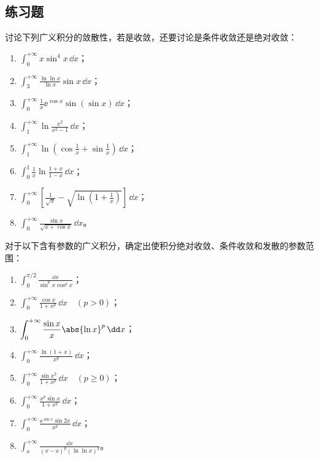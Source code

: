 \subsection{练习题}

\begin{xexercise}[1]
讨论下列广义积分的敛散性，若是收敛，还要讨论是条件收敛还是绝对收敛：
  \begin{enumerate}[label=(\arabic*)]
    \item $\displaystyle\int_0^{+\infty}x\sin^4x\,\dd x$；
    \item $\displaystyle\int_3^{+\infty}\frac{\ln\ln x}{\ln x}\sin x\,\dd x$；
    \item $\displaystyle\int_0^{+\infty}\frac1x\ee^{\cos x}\sin(\sin x)\,\dd x$；
    \item $\displaystyle\int_1^{+\infty}\ln\frac{x^2}{x^2-1}\,\dd x$；
    \item $\displaystyle\int_1^{+\infty}\ln\left(\cos\frac1x+\sin\frac1x\right)\,\dd x$；
    \item $\displaystyle\int_0^1\frac1x\ln\frac{1+x}{1-x}\,\dd x$；
    \item $\displaystyle\int_0^{+\infty}\left[\frac1{\sqrt{x}}-\sqrt{\ln\left(1+\frac1x\right)}\right]\,\dd x$；
    \item $\displaystyle\int_0^{+\infty}\frac{\sin x}{\sqrt{x+\cos x}}\,\dd x$。
  \end{enumerate}
\end{xexercise}

\begin{xexercise}[2]
对于以下含有参数的广义积分，确定出使积分绝对收敛、条件收敛和发散的参数范围：
  \begin{enumerate}[label=(\arabic*)]
    \item $\displaystyle\int_0^{\pi/2}\frac{\dd x}{\sin^p x\cos^q x}$；
    \item $\displaystyle\int_0^{+\infty}\frac{\cos x}{1+x^p}\,\dd x\quad(p>0)$；
    \item $\displaystyle\int_0^{+\infty}\frac{\sin x}{x}\abs{\ln x}^p\,\dd x$；
    \item $\displaystyle\int_0^{+\infty}\frac{\ln(1+x)}{x^p}\,\dd x$；
    \item $\displaystyle\int_0^{+\infty}\frac{\sin x^2}{1+x^p}\,\dd x\quad(p\geq0)$；
    \item $\displaystyle\int_0^{+\infty}\frac{x^p\sin x}{1+x^q}\,\dd x$；
    \item $\displaystyle\int_0^{+\infty}\frac{\ee^{\sin x}\sin2x}{x^p}\,\dd x$；
    \item $\displaystyle\int_{\ee}^{+\infty}\frac{\dd x}{(x-\ee)^p(\ln\ln x)^q}$。
  \end{enumerate}
\end{xexercise}


